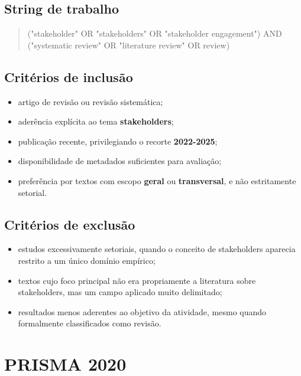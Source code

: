 \documentclass[12pt]{article}
\begin{document}
\subsection{String de trabalho}
\label{sec:org3ef1489}

\begin{quote}
("stakeholder" OR "stakeholders" OR "stakeholder engagement") AND ("systematic review" OR "literature review" OR review)
\end{quote}

\subsection{Critérios de inclusão}
\label{sec:orgf274cdc}

\begin{itemize}
\item artigo de revisão ou revisão sistemática;
\item aderência explícita ao tema \textbf{stakeholders};
\item publicação recente, privilegiando o recorte \textbf{2022-2025};
\item disponibilidade de metadados suficientes para avaliação;
\item preferência por textos com escopo \textbf{geral} ou \textbf{transversal}, e não estritamente setorial.
\end{itemize}

\subsection{Critérios de exclusão}
\label{sec:org084c53e}

\begin{itemize}
\item estudos excessivamente setoriais, quando o conceito de stakeholders aparecia restrito a um único domínio empírico;
\item textos cujo foco principal não era propriamente a literatura sobre stakeholders, mas um campo aplicado muito delimitado;
\item resultados menos aderentes ao objetivo da atividade, mesmo quando formalmente classificados como revisão.
\end{itemize}

\section{PRISMA 2020}
\label{sec:org21d85f4}
\end{document}
